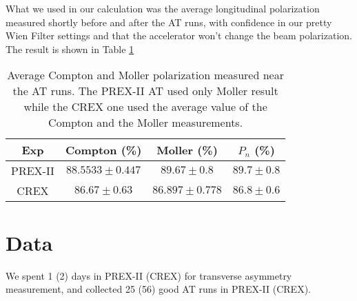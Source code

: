 What we used in our calculation was the average longitudinal polarization 
measured shortly before and after the AT runs, with confidence in our pretty Wien
Filter settings and that the accelerator won't change the beam polarization.
The result is shown in Table \ref{tab:AT_polarization}
\begin{table}[!h]
    \centering
    \begin{tabular}{c | c c c}
    \hline
    Exp	& Compton (\%)	& Moller (\%)	& $P_n$ (\%) \\
    \hline
    PREX-II & $88.5533 \pm 0.447$   & $89.67 \pm 0.8$	& $89.7 \pm 0.8$  \\
    CREX    & $86.67 \pm 0.63$	& $86.897 \pm 0.778$	& $86.8 \pm 0.6$  \\
    \hline
    \end{tabular}
    \caption{Average Compton and Moller polarization measured near the AT runs. 
    The PREX-II AT used only Moller result while the CREX one used the average value of the 
    Compton and the Moller measurements.}
    \label{tab:AT_polarization}
\end{table}

\section{Data}

We spent 1 (2) days in PREX-II (CREX) for transverse asymmetry measurement,
and collected 25 (56) good AT runs in PREX-II (CREX).

